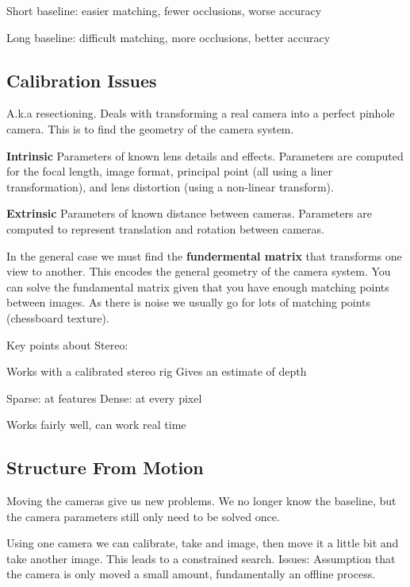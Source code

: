 \documentclass[8pt]{extarticle}
\begin{document}
\begin{multicols}{2}
\begin{compactitem}
    \item Short baseline: easier matching, fewer occlusions, worse accuracy
    \item Long baseline: difficult matching, more occlusions, better accuracy
\end{compactitem}

\subsection{Calibration Issues}
A.k.a resectioning. Deals with transforming a real camera into a perfect pinhole camera. This is to find the geometry of the camera system.

\textbf{Intrinsic} Parameters of known lens details and effects. Parameters are computed for the focal length, image format, principal point (all using a liner transformation), and lens distortion (using a non-linear transform).

\textbf{Extrinsic} Parameters of known distance between cameras. Parameters are computed to represent translation and rotation between cameras.

In the general case we must find the \textbf{fundermental matrix} that transforms one view to another. This encodes the general geometry of the camera system. You can solve the fundamental matrix given that you have enough matching points between images. As there is noise we usually go for lots of matching points (chessboard texture).

Key points about Stereo:
\begin{compactitem}
    \item Works with a calibrated stereo rig Gives an estimate of depth
    \item Sparse: at features Dense: at every pixel
    \item  Works fairly well, can work real time
\end{compactitem}

\subsection{Structure From Motion}
Moving the cameras give us new problems. We no longer know the baseline, but the camera parameters still only need to be solved once.

Using one camera we can calibrate, take and image, then move it a little bit and take another image. This leads to a constrained search. Issues: Assumption that the camera is only moved a small amount, fundamentally an offline process.


\end{multicols}
\end{document}
